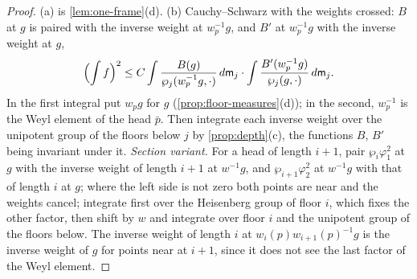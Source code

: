 \begin{proof}
(a) is \cref{lem:one-frame}(d). (b) Cauchy--Schwarz with the weights crossed: $B$ at $g$ is paired with the inverse weight at $w_p^{-1}g$, and $B'$ at $w_p^{-1}g$ with the inverse weight at $g$,
\[
  \Bigl(\int f\Bigr)^2\le C\int\frac{B(g)}{\wp_j(w_p^{-1}g,\cdot)}\,d\mathsf m_j\cdot\int\frac{B'(w_p^{-1}g)}{\wp_j(g,\cdot)}\,d\mathsf m_j .
\]
In the first integral put $w_pg$ for $g$ (\cref{prop:floor-measures}(d)); in the second, $w_p^{-1}$ is the Weyl element of the head $\bar p$. Then integrate each inverse weight over the unipotent group of the floors below $j$ by
\cref{prop:depth}(c), the functions $B$, $B'$ being invariant under it. \emph{Section variant.} For a head of length $i+1$, pair $\wp_i\varphi_1^2$ at $g$ with the inverse weight of length $i+1$ at $w^{-1}g$, and $\wp_{i+1}\varphi_2^2$ at $w^{-1}g$
with that of length $i$ at $g$; where the left side is not zero both points are near and the weights cancel; integrate first over the Heisenberg group of floor $i$, which fixes the other factor, then shift by $w$ and integrate over floor $i$
and the unipotent group of the floors below. The inverse weight of length $i$ at $w_i(p)w_{i+1}(p)^{-1}g$ is the inverse weight of $g$ for points near at $i+1$, since it does not see the last factor of the Weyl element.
\end{proof}

